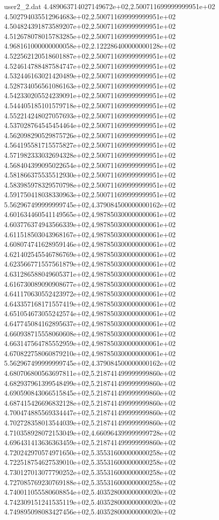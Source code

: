 \begin{filecontents}{user2_2.dat}
4.489063714027149672e+02,2.500711699999999951e+02
4.502794035512964683e+02,2.500711699999999951e+02
4.504824391873589207e+02,2.500711699999999951e+02
4.512678078015783285e+02,2.500711699999999951e+02
4.968161000000000058e+02,2.122286400000000128e+02
4.522562120518601887e+02,2.500711699999999951e+02
4.524614788487584747e+02,2.500711699999999951e+02
4.532446163021420489e+02,2.500711699999999951e+02
4.528734056561086163e+02,2.500711699999999951e+02
4.542330205524239091e+02,2.500711699999999951e+02
4.544405185101579718e+02,2.500711699999999951e+02
4.552214248027057693e+02,2.500711699999999951e+02
4.537028764545454464e+02,2.500711699999999951e+02
4.562098290529875726e+02,2.500711699999999951e+02
4.564195581715575827e+02,2.500711699999999951e+02
4.571982333032694328e+02,2.500711699999999951e+02
4.568404399095022654e+02,2.500711699999999951e+02
4.581866375535512930e+02,2.500711699999999951e+02
4.583985978329570798e+02,2.500711699999999951e+02
4.591750418038330963e+02,2.500711699999999951e+02
5.562967499999999745e+02,4.379084500000000162e+02
4.601634460541149565e+02,4.987850300000000061e+02
4.603776374943566339e+02,4.987850300000000061e+02
4.611518503043968167e+02,4.987850300000000061e+02
4.608074741628959146e+02,4.987850300000000061e+02
4.621402545546786769e+02,4.987850300000000061e+02
4.623566771557561879e+02,4.987850300000000061e+02
4.631286588049605371e+02,4.987850300000000061e+02
4.616730089090908677e+02,4.987850300000000061e+02
4.641170630552423972e+02,4.987850300000000061e+02
4.643357168171557419e+02,4.987850300000000061e+02
4.651054673055242574e+02,4.987850300000000061e+02
4.647745084162895637e+02,4.987850300000000061e+02
4.660938715558060608e+02,4.987850300000000061e+02
4.663147564785552959e+02,4.987850300000000061e+02
4.670822758060879210e+02,4.987850300000000061e+02
5.562967499999999745e+02,4.379084500000000162e+02
4.680706800563697811e+02,5.218741499999999860e+02
4.682937961399548499e+02,5.218741499999999860e+02
4.690590843066515845e+02,5.218741499999999860e+02
4.687415426696832128e+02,5.218741499999999860e+02
4.700474885569334447e+02,5.218741499999999860e+02
4.702728358013544039e+02,5.218741499999999860e+02
4.710358928072153049e+02,4.660964399999999728e+02
4.696431413636363459e+02,5.218741499999999860e+02
4.720242970574971650e+02,5.355316000000000258e+02
4.722518754627539010e+02,5.355316000000000258e+02
4.730127013077790252e+02,5.355316000000000258e+02
4.727085769230769188e+02,5.355316000000000258e+02
4.740011055580608854e+02,5.403528000000000020e+02
4.742309151241535119e+02,5.403528000000000020e+02
4.749895098083427456e+02,5.403528000000000020e+02

\end{filecontents}
